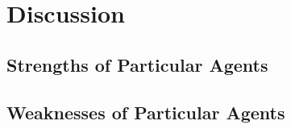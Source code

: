 
\section{Discussion}


\subsection{Strengths of Particular Agents}


\subsection{Weaknesses of Particular Agents}

